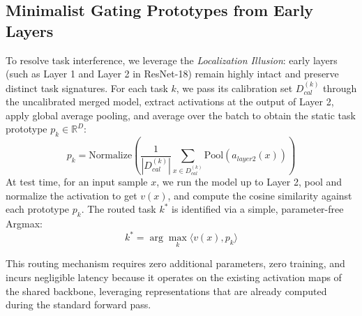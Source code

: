 \documentclass{article}
\theoremstyle{plain}
\theoremstyle{definition}
\theoremstyle{remark}
\begin{document}
\subsection{Minimalist Gating Prototypes from Early Layers}
To resolve task interference, we leverage the \textit{Localization Illusion}: early layers (such as Layer 1 and Layer 2 in ResNet-18) remain highly intact and preserve distinct task signatures. 
For each task $k$, we pass its calibration set $D_{cal}^{(k)}$ through the uncalibrated merged model, extract activations at the output of Layer 2, apply global average pooling, and average over the batch to obtain the static task prototype $p_k \in \mathbb{R}^D$:
\begin{equation}
p_k = \text{Normalize}\left( \frac{1}{|D_{cal}^{(k)}|} \sum_{x \in D_{cal}^{(k)}} \text{Pool}(a_{layer2}(x)) \right)
\end{equation}
At test time, for an input sample $x$, we run the model up to Layer 2, pool and normalize the activation to get $v(x)$, and compute the cosine similarity against each prototype $p_k$. The routed task $k^*$ is identified via a simple, parameter-free Argmax:
\begin{equation}
k^* = \arg\max_k \langle v(x), p_k \rangle
\end{equation}

This routing mechanism requires zero additional parameters, zero training, and incurs negligible latency because it operates on the existing activation maps of the shared backbone, leveraging representations that are already computed during the standard forward pass.
\end{document}
